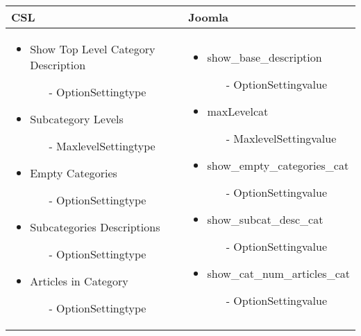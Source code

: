 \begin{minipage}{0.7\textwidth}
\begin{tabular}{| p{}|p{}|}
\hline
\textbf{CSL} & \textbf{Joomla} \\ 
\hline
\begin{itemize}
	\item Show Top Level Category Description
	\begin{enumerate}
			 \item[-] OptionSettingtype
	\end{enumerate} 
	\item Subcategory Levels 
		\begin{enumerate}
				 \item[-] MaxlevelSettingtype
		\end{enumerate}
	\item Empty Categories 
		\begin{enumerate}
			 \item[-] OptionSettingtype
		\end{enumerate}
	\item Subcategories Descriptions
	 \begin{enumerate}
	 		 \item[-] OptionSettingtype
	 \end{enumerate}
	\item Articles in Category 
	  \begin{enumerate}
			 \item[-] OptionSettingtype
	\end{enumerate}
\end{itemize}
 & 
\begin{itemize}
	\item show\_base\_description
	\begin{enumerate}
			 \item[-] OptionSettingvalue
	\end{enumerate} 
	\item maxLevelcat 
		\begin{enumerate}
				 \item[-] MaxlevelSettingvalue
		\end{enumerate}
	\item show\_empty\_categories\_cat 
		\begin{enumerate}
			 \item[-] OptionSettingvalue
		\end{enumerate}
	\item show\_subcat\_desc\_cat
	 \begin{enumerate}
	 		 \item[-] OptionSettingvalue
	 \end{enumerate}
	\item show\_cat\_num\_articles\_cat 
	  \begin{enumerate}
			 \item[-] OptionSettingvalue
	\end{enumerate}
\end{itemize}
\\
\hline
\end{tabular}
\end{minipage}


